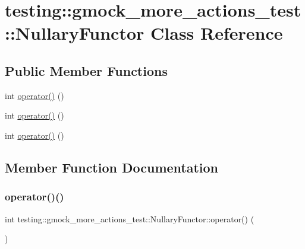 \hypertarget{classtesting_1_1gmock__more__actions__test_1_1_nullary_functor}{}\section{testing\+::gmock\+\_\+more\+\_\+actions\+\_\+test\+::Nullary\+Functor Class Reference}
\label{classtesting_1_1gmock__more__actions__test_1_1_nullary_functor}
\subsection*{Public Member Functions}
\begin{DoxyCompactItemize}
\item 
int \mbox{\hyperlink{classtesting_1_1gmock__more__actions__test_1_1_nullary_functor_a50f1e39b9ee381693e8bb871acf4e3a9}{operator()}} ()
\item 
int \mbox{\hyperlink{classtesting_1_1gmock__more__actions__test_1_1_nullary_functor_a50f1e39b9ee381693e8bb871acf4e3a9}{operator()}} ()
\item 
int \mbox{\hyperlink{classtesting_1_1gmock__more__actions__test_1_1_nullary_functor_a50f1e39b9ee381693e8bb871acf4e3a9}{operator()}} ()
\end{DoxyCompactItemize}


\subsection{Member Function Documentation}
\mbox{\label{classtesting_1_1gmock__more__actions__test_1_1_nullary_functor_a50f1e39b9ee381693e8bb871acf4e3a9}} 
\subsubsection{\texorpdfstring{operator()()}{operator()()}\hspace{0.1cm}{\footnotesize\ttfamily [1/3]}}
{\footnotesize\ttfamily int testing\+::gmock\+\_\+more\+\_\+actions\+\_\+test\+::\+Nullary\+Functor\+::operator() (\begin{DoxyParamCaption}{ }\end{DoxyParamCaption})\hspace{0.3cm}{\ttfamily [inline]}}

